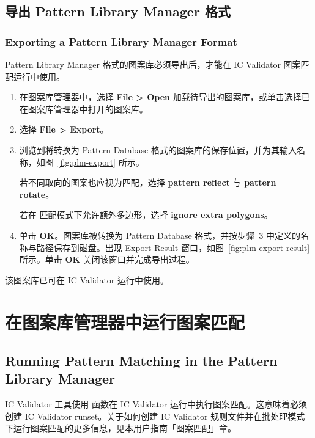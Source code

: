 \subsection{导出 Pattern Library Manager 格式}
\subsubsection*{Exporting a Pattern Library Manager Format}

Pattern Library Manager 格式的图案库必须导出后，才能在 IC Validator 图案匹配运行中使用。

\begin{enumerate}
  \item 在图案库管理器中，选择 \textbf{File > Open} 加载待导出的图案库，或单击选择已在图案库管理器中打开的图案库。
  \item 选择 \textbf{File > Export}。
  \item 浏览到将转换为 Pattern Database 格式的图案库的保存位置，并为其输入名称，如图~\ref{fig:plm-export} 所示。

  若不同取向的图案也应视为匹配，选择 \textbf{pattern reflect} 与 \textbf{pattern rotate}。

  若在  匹配模式下允许额外多边形，选择 \textbf{ignore extra polygons}。


  \item 单击 \textbf{OK}。图案库被转换为 Pattern Database 格式，并按步骤~3 中定义的名称与路径保存到磁盘。出现 Export Result 窗口，如图~\ref{fig:plm-export-result} 所示。单击 \textbf{OK} 关闭该窗口并完成导出过程。

\end{enumerate}

该图案库已可在 IC Validator 运行中使用。

\section{在图案库管理器中运行图案匹配}
\subsection*{Running Pattern Matching in the Pattern Library Manager}

IC Validator 工具使用  函数在 IC Validator 运行中执行图案匹配。这意味着必须创建 IC Validator runset。关于如何创建 IC Validator 规则文件并在批处理模式下运行图案匹配的更多信息，见本用户指南「图案匹配」章。

